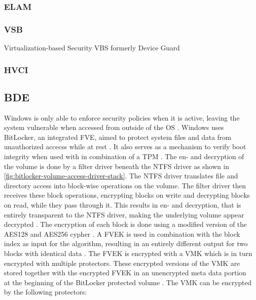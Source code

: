 \subsubsection{ELAM}
\cite{understanding-windows-trusted-boot}

\subsubsection{VSB}
Virtualization-based Security {VBS}
formerly Device Guard
\subsubsection{HVCI}

\subsection{\acf{BDE}}
\label{sec:windows:security:bde}
Windows is only able to enforce security policies when it is active, leaving the system vulnerable when accessed from outside of the \ac{OS} \cite[Section 9]{windows-internals-6-part2}.
Windows uses BitLocker, an integrated \ac{FVE}, aimed to protect system files and data from unauthorized accecss while at rest \cite{microsoft-bitlocker-overview}.
It also serves as a mechanism to verify boot integrity when used with in combination of a \ac{TPM} \cite[Section 9]{windows-internals-6-part2}.
The en- and decryption of the volume is done by a filter driver beneath the \ac{NTFS} driver as shown in \autoref{fig:bitlocker-volume-access-driver-stack}.
The \ac{NTFS} driver translates file and directory access into block-wise operations on the volume.
The filter driver then receives these block operations, encrypting blocks on write and decrypting blocks on read, while they pass through it.
This results in en- and decryption, that is entirely transparent to the \ac{NTFS} driver, making the underlying volume appear decrypted \cite[Section 9]{windows-internals-6-part2}.
The encryption of each block is done using a modified version of the \ac{AES}128 and \ac{AES}256 cypher \cite[Section 9]{windows-internals-6-part2}.
A \ac{FVEK} is used in combination with the block index as input for the algorithm, resulting in an entirely different output for two blocks with identical data \cite[Section 9]{windows-internals-6-part2}.
The \ac{FVEK} is encrypted with a \ac{VMK} which is in turn encrypted with multiple protectors.
These encrypted versions of the \ac{VMK} are stored together with the encrypted \ac{FVEK} in an unencrypted meta data portion at the beginning of the BitLocker protected volume \cite[Section 9]{windows-internals-6-part2}.
The \ac{VMK} can be encrypted by the following protectors:

